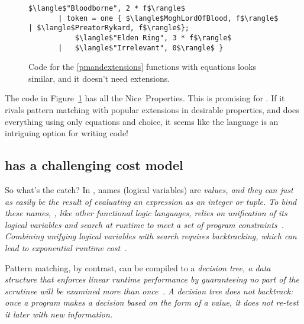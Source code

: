 \documentclass[manuscript,screen,review, 12pt, nonacm]{acmart}
\begin{document}
\begin{figure}[ht]
\begin{minipage}[h]{\linewidth}
\begin{lstlisting}[numbers=none, basicstyle=\tiny, xleftmargin=9em, 
                            frame=single, showstringspaces=false]
           $\langle$"Bloodborne", 2 * f$\rangle$
       | token = one { $\langle$MoghLordOfBlood, f$\rangle$ | $\langle$PreatorRykard, f$\rangle$}; 
           $\langle$"Elden Ring", 3 * f$\rangle$
       |   $\langle$"Irrelevant", 0$\rangle$ }
          \end{lstlisting}
            \label{fig:versegot} 
        \vspace{4ex}
        \end{minipage}%
    \caption{Code for the \ref{pmandextensions} functions with equations looks
    similar, and it doesn't need extensions.}
    \label{fig:verseextfuncs}
      \end{figure}
        
    The code in Figure~\ref{fig:verseextfuncs} has all the Nice~Properties. This
    is promising for \VC. If it rivals pattern matching with popular extensions
    in desirable properties, and \VC does everything using only equations and
    choice, it seems like the language is an intriguing option for writing code! 

    \subsection{\VC has a challenging cost model}
    \label{vcbadcost}

    So what's the catch? In \VC, names (logical variables) are \it{values}, and
    they can just as easily be the result of evaluating an expression as an
    integer or tuple. To bind these names, \VC, like other functional logic
    languages, relies on \it{unification} of its logical variables and
    \it{search} at runtime to meet a set of program
    constraints~\citep{antoy2010functional, hanus2013functional}. Combining
    unifying logical variables with search requires backtracking, which can lead
    to exponential runtime cost~\citep{hanus2013functional, wadler1985replace,
    clark1982introduction}. 


    Pattern matching, by contrast, can be compiled to a \it{decision tree}, a
    data structure that enforces linear runtime performance by guaranteeing no
    part of the scrutinee will be examined more than once~\citep{maranget}. A
    decision tree does not backtrack: once a program makes a decision based on
    the form of a value, it does not re-test it later with new information. 
    
\end{document}
